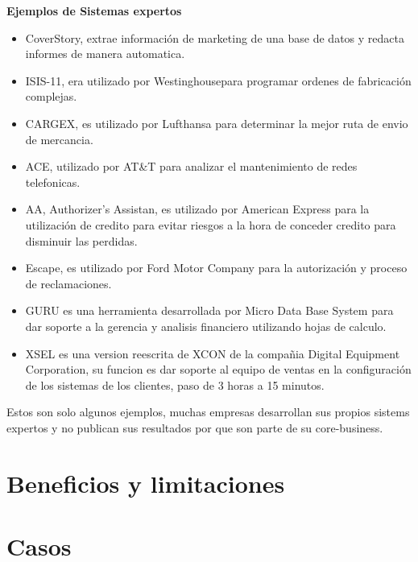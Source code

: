 \documentclass[12pt, twoside, openright]{report} %
\begin{document}
\textbf{Ejemplos de Sistemas expertos}
\begin{itemize}
	\item CoverStory, extrae información de marketing de una base de datos y redacta informes de manera automatica.
	\item ISIS-11, era utilizado por Westinghousepara programar ordenes de fabricación complejas.
	\item CARGEX, es utilizado por Lufthansa para determinar la mejor ruta de envio de mercancia.
	\item ACE, utilizado por AT\&T para analizar el mantenimiento de redes telefonicas.
	\item AA, Authorizer's Assistan, es utilizado por American Express para la utilización de credito para evitar riesgos a la hora de conceder credito para disminuir las perdidas.
	\item Escape, es utilizado por Ford Motor Company para la autorización y proceso de reclamaciones.
	\item GURU es una herramienta desarrollada por Micro Data Base System para dar soporte a la gerencia y analisis financiero utilizando hojas de calculo.
	\item XSEL es una version reescrita de XCON de la compañia Digital Equipment Corporation, su funcion es dar soporte al equipo de ventas en la configuración de los sistemas de los clientes, paso de 3 horas a 15 minutos. 	
\end{itemize}

Estos son solo algunos ejemplos, muchas empresas desarrollan sus propios sistems expertos y no publican sus resultados por que son parte de su core-business.

\section{Beneficios y limitaciones}

\section{Casos}
\end{document}
